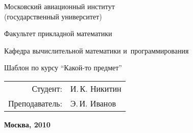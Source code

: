 \begin{titlepage}
\begin{center} %

\bfseries

	{\Large Московский авиационный институт \\
	(государственный  университет)
	
	} %

\vspace{48pt}


	{\large Факультет прикладной математики
	
	}


\vspace{36pt}

	{\large Кафедра вычислительной математики и~программирования
	
	} %

\vspace{48pt}

	Шаблон по курсу \enquote{Какой-то предмет} 

\vspace{12pt}


\end{center} %

\vspace{60pt}

	\begin{flushright}
		\begin{tabular}{rl}
			Студент: & И.\,К. Никитин \\
			Преподаватель: & Э.\,И. Иванов \\
		\end{tabular}
	\end{flushright}

\vfill

	\begin{center} %
		\bfseries
		Москва, 2010
	\end{center}
	
\end{titlepage} 

